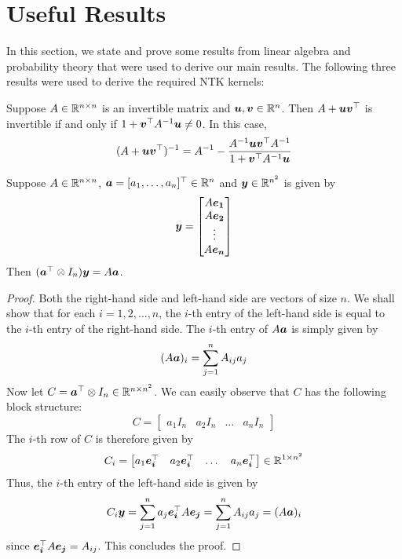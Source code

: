 \section{Useful Results}
\label{app:lemm}
In this section, we state and prove some results from linear algebra and probability theory that were used to derive our main results. The following three results were used to derive the required NTK kernels:
\begin{theorem}
\label{thm:sherman_mor}
    Suppose $A\in \mathbb{R}^{n\times n}$ is an invertible matrix and $\boldsymbol{u},\boldsymbol{v} \in \mathbb{R}^n$. Then $A + \boldsymbol{u}\boldsymbol{v}^\top$ is invertible if and only if $1+\boldsymbol{v}^\top A^{-1} \boldsymbol{u} \neq 0$. In this case, 
    $$(A + \boldsymbol{u}\boldsymbol{v}^\top)^{-1}=A^{-1}-\frac{A^{-1}\boldsymbol{u}\boldsymbol{v}^\top A^{-1}}{1+\boldsymbol{v}^\top A^{-1} \boldsymbol{u}}$$
\end{theorem}

\begin{lemma}
\label{lemm:kron}
    Suppose $A \in \mathbb{R}^{n \times n}$, $\boldsymbol{a} = [a_1,\dots,a_n]^\top \in \mathbb{R}^{n}$ and $\boldsymbol{y} \in \mathbb{R}^{n^2}$ is given by 
    $$\boldsymbol{y} = \begin{bmatrix}
        A\boldsymbol{e_1} \\
        A\boldsymbol{e_2} \\
        \vdots \\
        A\boldsymbol{e_n}
    \end{bmatrix}$$
    Then $(\boldsymbol{a}^\top \otimes I_n)\boldsymbol{y} = A\boldsymbol{a}$.
\end{lemma}

\begin{proof}
    Both the right-hand side and left-hand side are vectors of size $n$. We shall show that for each $i=1,2,\dots, n$, the $i$-th entry of the left-hand side is equal to the $i$-th entry of the right-hand side. The $i$-th entry of $A\boldsymbol{a}$ is simply given by 
    $$(A\boldsymbol{a})_i = \sum_{j=1}^n A_{ij} a_j$$
    Now let $C = \boldsymbol{a}^\top \otimes I_n \in \mathbb{R}^{n \times n^2}$. We can easily observe that $C$ has the following block structure: 
    $$C = \begin{bmatrix}
        a_1 I_n & a_2 I_n & \dots & a_n I_n
    \end{bmatrix}$$
    The $i$-th row of $C$ is therefore given by 
    $$C_i = \begin{bmatrix}
        a_1 \boldsymbol{e_i}^\top & a_2 \boldsymbol{e_i}^\top & \dots & a_n \boldsymbol{e_i}^\top 
    \end{bmatrix} \in \mathbb{R}^{1\times n^2}$$
    Thus, the $i$-th entry of the left-hand side is given by 
    $$C_i \boldsymbol{y} = \sum_{j=1}^n a_j \boldsymbol{e_i}^\top A\boldsymbol{e_j} = \sum_{j=1}^n A_{ij}a_j = (A\boldsymbol{a})_i$$
    since $\boldsymbol{e_i}^\top A \boldsymbol{e_j} = A_{ij}$.
    This concludes the proof.
    
\end{proof}

